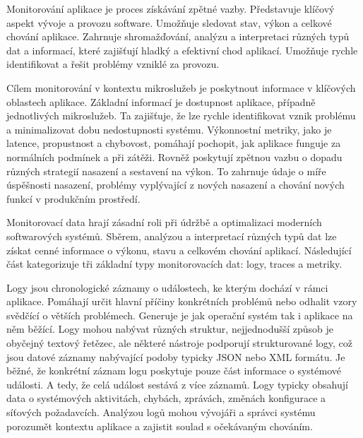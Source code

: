 


Monitorování aplikace je proces získávání zpětné vazby. Představuje klíčový aspekt vývoje a provozu software. \cite{Riedesel2021} Umožňuje sledovat stav, výkon a celkové chování aplikace. Zahrnuje shromažďování, analýzu a interpretaci různých typů dat a informací, které zajišťují hladký a efektivní chod aplikací. Umožňuje rychle identifikovat a řešit problémy vzniklé za provozu. 


Cílem monitorování v kontextu mikroslužeb je poskytnout informace v klíčových oblastech aplikace. Základní informací je dostupnost aplikace, případně jednotlivých mikroslužeb. Ta zajišťuje, že lze rychle identifikovat vznik problému a minimalizovat dobu nedostupnosti systému. Výkonnostní metriky, jako je latence, propustnost a chybovost, pomáhají pochopit, jak aplikace funguje za normálních podmínek a při zátěži. \cite{Riedesel2021} Rovněž poskytují zpětnou vazbu o dopadu různých strategií nasazení a sestavení na výkon. To zahrnuje údaje o míře úspěšnosti nasazení, problémy vyplývající z nových nasazení a chování nových funkcí v produkčním prostředí.


Monitorovací data hrají zásadní roli při údržbě a optimalizaci moderních softwarových systémů. Sběrem, analýzou a interpretací různých typů dat lze získat cenné informace o výkonu, stavu a celkovém chování aplikací. Následující část kategorizuje tři základní typy monitorovacích dat: logy, traces a metriky. \cite{Majors2022}


Logy jsou chronologické záznamy o událostech, ke kterým dochází v rámci aplikace. Pomáhají určit hlavní příčiny konkrétních problémů nebo odhalit vzory svědčící o větších problémech. Generuje je jak operační systém tak i aplikace na něm běžící. Logy mohou nabývat různých struktur, nejjednodušší způsob je obyčejný textový řetězec, ale některé nástroje podporují strukturované logy, což jsou datové záznamy nabývající podoby typicky JSON nebo XML formátu. Je běžné, že konkrétní záznam logu poskytuje pouze část informace o systémové události. A tedy, že celá událost sestává z více záznamů. \cite{Majors2022} Logy typicky obsahují data o systémových aktivitách, chybách, zprávách, změnách konfigurace a síťových požadavcích. Analýzou logů mohou vývojáři a správci systému porozumět kontextu aplikace a zajistit soulad s očekávaným chováním. \cite{Majors2022}

